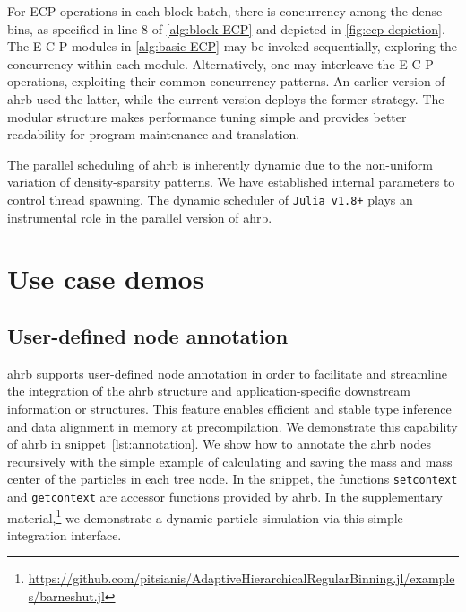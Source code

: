 \documentclass[final]{juliacon}
\begin{document}
For ECP operations in each block batch, there is concurrency among the
dense bins, as specified in line $8$ of \cref{alg:block-ECP} and
depicted in \cref{fig:ecp-depiction}. The E-C-P modules in
\cref{alg:basic-ECP} may be invoked sequentially, exploring the
concurrency within each module. Alternatively, one may interleave the
E-C-P operations, exploiting their common concurrency patterns. An
earlier version of {\sc ahrb} used the latter, while the current
version deploys the former strategy. The modular structure makes
performance tuning simple and provides better readability for program
maintenance and translation.

The parallel scheduling of {\sc ahrb} is inherently dynamic due to the
non-uniform variation of density-sparsity patterns. We have established internal
parameters to control thread spawning. The dynamic scheduler of \texttt{Julia
v1.8+} plays an instrumental role in the parallel version of {\sc ahrb}.


%
%
%
 


\section{Use case demos}
\label{sec:use-cases}

%
%
%
%

%
%

\subsection{User-defined node annotation}
\label{sec:nbody-simulation}

%
%
%
%
%
%
%
%

{\sc ahrb} supports user-defined node annotation in order to facilitate and
streamline the integration of the {\sc ahrb} structure and application-specific
downstream information or structures. This feature enables efficient and stable
type inference and data alignment in memory at precompilation.
%
We demonstrate this capability of {\sc ahrb} in snippet~\ref{lst:annotation}. We
show how to annotate the {\sc ahrb} nodes recursively with the simple example of
calculating and saving the mass and mass center of the particles in each tree
node. In the snippet, the functions {\tt setcontext} and {\tt getcontext} are
accessor functions provided by {\sc ahrb}. In the supplementary
material,\footnote{\scriptsize \href{https://github.com/pitsianis/AdaptiveHierarchicalRegularBinning.jl/examples/barneshut.jl}{https://github.com/pitsianis/AdaptiveHierarchicalRegularBinning.jl/examples/barneshut.jl}}
we demonstrate a dynamic particle simulation via this simple integration
interface.
\end{document}
